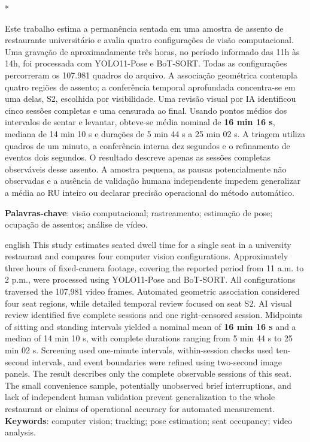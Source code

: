 \documentclass[12pt,a4paper,twoside,openany,chapter=TITLE,subsection=TITLE,section=TITLE,subsubsection=TITLE,english,brazil]{abntex2}
\begin{document}
\pretextual
\imprimircapa
\imprimirfolhaderosto[]*
\clearpage
\begin{resumo}[Resumo]
Este trabalho estima a permanência sentada em uma amostra de assento de restaurante universitário e avalia quatro configurações de visão computacional. Uma gravação de aproximadamente três horas, no período informado das 11h às 14h, foi processada com YOLO11-Pose e BoT-SORT. Todas as configurações percorreram os 107.981 quadros do arquivo. A associação geométrica contempla quatro regiões de assento; a conferência temporal aprofundada concentra-se em uma delas, S2, escolhida por visibilidade. Uma revisão visual por IA identificou cinco sessões completas e uma censurada ao final. Usando pontos médios dos intervalos de sentar e levantar, obteve-se média nominal de \textbf{16 min 16 s}, mediana de 14 min 10 s e durações de 5 min 44 s a 25 min 02 s. A triagem utiliza quadros de um minuto, a conferência interna dez segundos e o refinamento de eventos dois segundos. O resultado descreve apenas as sessões completas observáveis desse assento. A amostra pequena, as pausas potencialmente não observadas e a ausência de validação humana independente impedem generalizar a média ao RU inteiro ou declarar precisão operacional do método automático.

\vspace{\onelineskip}
\noindent\textbf{Palavras-chave}: visão computacional; rastreamento; estimação de pose; ocupação de assentos; análise de vídeo.
\end{resumo}
\begin{resumo}[Abstract]
\begin{otherlanguage*}{english}
This study estimates seated dwell time for a single seat in a university restaurant and compares four computer vision configurations. Approximately three hours of fixed-camera footage, covering the reported period from 11 a.m. to 2 p.m., were processed using YOLO11-Pose and BoT-SORT. All configurations traversed the 107,981 video frames. Automated geometric association considered four seat regions, while detailed temporal review focused on seat S2. AI visual review identified five complete sessions and one right-censored session. Midpoints of sitting and standing intervals yielded a nominal mean of \textbf{16 min 16 s} and a median of 14 min 10 s, with complete durations ranging from 5 min 44 s to 25 min 02 s. Screening used one-minute intervals, within-session checks used ten-second intervals, and event boundaries were refined using two-second image panels. The result describes only the complete observable sessions of this seat. The small convenience sample, potentially unobserved brief interruptions, and lack of independent human validation prevent generalization to the whole restaurant or claims of operational accuracy for automated measurement.
\vspace{\onelineskip}
\noindent\textbf{Keywords}: computer vision; tracking; pose estimation; seat occupancy; video analysis.
\end{otherlanguage*}
\end{resumo}
\tableofcontents*
\clearpage
\textual
\SingleSpacing
\raggedbottom
\setlength{\beforechapskip}{0pt}
\setlength{\afterchapskip}{18pt}
\setbeforesecskip{14pt}
\setaftersecskip{7pt}
\end{document}
